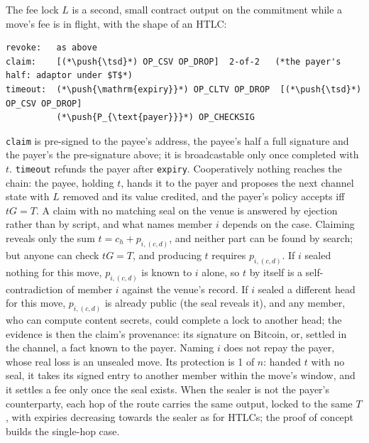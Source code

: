 \documentclass[11pt]{article}
\newcommand{\push}[1]{\ensuremath{\langle #1\rangle}}
\newcommand{\tsd}{\Delta}
\begin{document}
The fee lock $L$ is a second, small contract output on the commitment
while a move's fee is in flight, with the shape of an HTLC:
\begin{lstlisting}[style=script]
revoke:   as above
claim:    [(*\push{\tsd}*) OP_CSV OP_DROP]  2-of-2   (*the payer's half: adaptor under $T$*)
timeout:  (*\push{\mathrm{expiry}}*) OP_CLTV OP_DROP  [(*\push{\tsd}*) OP_CSV OP_DROP]
          (*\push{P_{\text{payer}}}*) OP_CHECKSIG
\end{lstlisting}
\texttt{claim} is pre-signed to the payee's address, the payee's half a
full signature and the payer's the pre-signature above; it is
broadcastable only once completed with $t$. \texttt{timeout} refunds
the payer after \texttt{expiry}. Cooperatively nothing reaches the
chain: the payee, holding $t$, hands it to the payer and proposes the
next channel state with $L$ removed and its value credited, and the
payer's policy accepts iff $tG = T$. A claim with no matching seal on
the venue is answered by ejection rather than by script, and what names
member $i$ depends on the case. Claiming reveals only the sum $t = c_h
+ p_{i,(c,d)}$, and neither part can be found by search; but anyone can
check $tG = T$, and producing $t$ requires $p_{i,(c,d)}$. If $i$ sealed
nothing for this move, $p_{i,(c,d)}$ is known to $i$ alone, so $t$ by
itself is a self-contradiction of member $i$ against the venue's
record. If $i$ sealed a different head for this move, $p_{i,(c,d)}$ is
already public (the seal reveals it), and any member, who can compute
content secrets, could complete a lock to another head; the evidence is
then the claim's provenance: its signature on Bitcoin, or, settled in
the channel, a fact known to the payer. Naming $i$ does not repay the
payer, whose real loss is an unsealed move. Its protection is 1 of $n$:
handed $t$ with no seal, it takes its signed entry to another member
within the move's window, and it settles a fee only once the seal
exists. When the sealer is not the
payer's counterparty, each hop of the route carries the same output,
locked to the same $T$, with expiries decreasing towards the sealer as
for HTLCs; the proof of concept builds the single-hop case.
\end{document}
